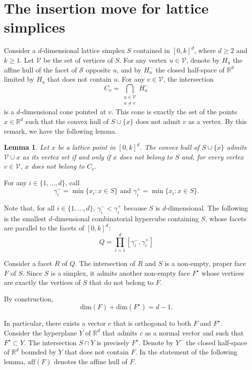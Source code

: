 \documentclass[a4paper]{article}
\newtheorem{lemma}{Lemma}
\renewcommand{\S}{\mathcal{S}}
\begin{document}
\section{The insertion move for lattice simplices}\label{sec.insert}

Consider a $d$-dimensional lattice simplex $S$ contained in $[0,k]^d$, where $d\geq2$ and $k\geq1$. Let $\mathcal{V}$ be the set of vertices of $S$. For any vertex $u\in\mathcal{V}$, denote by $H_u$ the affine hull of the facet of $\S$ opposite $u$, and by $H_u^-$ the closed half-space of $\mathbb{R}^d$ limited by $H_u$ that does not contain $u$.
For any $v\in\mathcal{V}$, the intersection
\begin{equation}
  C_v=\bigcap_{\substack{u\in\mathcal{V}\\u\neq{v}}}H_u^-
\end{equation}
is a $d$-dimensional cone pointed at $v$. This cone is exactly the set of the points $x\in\mathbb{R}^d$ such that the convex hull of $S\cup\{x\}$ does not admit $v$ as a vertex. By this remark, we have the following lemma.

\begin{lemma}\label{Lem.A}
Let $x$ be a lattice point in $[0,k]^d$. The convex hull of $S\cup\{x\}$ admits $\mathcal{V}\cup{x}$ as its vertex set if and only if $x$ does not belong to $S$ and, for every vertex $v\in\mathcal{V}$, $x$ does not belong to $C_v$.
\end{lemma}

For any $i\in\{1, ..., d\}$, call
$$
\gamma_i^-=\min\{x_i:x\in{S}\}\mbox{ and }\gamma_i^+=\min\{x_i:x\in{S}\}\mbox{.}
$$

Note that, for all $i\in\{1, ..., d\}$, $\gamma_i^-<\gamma_i^+$ because $S$ is $d$-dimensional. The following is the smallest $d$-dimensional combinatorial hypercube containing $S$, whose facets are parallel to the facets of $[0,k]^d$:
$$
Q=\prod_{i=1}^d[\gamma_i^-,\gamma_i^+]
$$

Consider a facet $R$ of $Q$. The intersection of $R$ and $S$ is a non-empty, proper face $F$ of $S$. Since $S$ is a simplex, it admits another non-empty face $F^\star$ whose vertices are exactly the vertices of $S$ that do not belong to $F$.

By construction,
$$
\mathrm{dim}(F)+\mathrm{dim}(F^\star)=d-1\mbox{.}
$$

In particular, there exists a vector $c$ that is orthogonal to both $F$ and $F^\star$. Consider the hyperplane $Y$ of $\mathbb{R}^d$ that admits $c$ as a normal vector and such that $F^\star\subset{Y}$. The intersection $S\cap{Y}$ is precisely $F^\star$. Denote by $Y^-$ the closed half-space of $\mathbb{R}^d$ bounded by $Y$ that does not contain $F$. In the statement of the following lemma, $\mathrm{aff}(F)$ denotes the affine hull of $F$.
\end{document}
